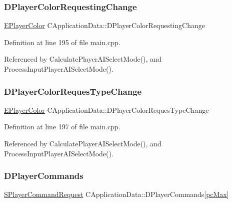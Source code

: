 \subsubsection{\texorpdfstring{D\+Player\+Color\+Requesting\+Change}{DPlayerColorRequestingChange}}
{\footnotesize\ttfamily \hyperlink{GameDataTypes_8h_aafb0ca75933357ff28a6d7efbdd7602f}{E\+Player\+Color} C\+Application\+Data\+::\+D\+Player\+Color\+Requesting\+Change\hspace{0.3cm}{\ttfamily [protected]}}



Definition at line 195 of file main.\+cpp.



Referenced by Calculate\+Player\+A\+I\+Select\+Mode(), and Process\+Input\+Player\+A\+I\+Select\+Mode().

\hypertarget{classCApplicationData_a6724e09974db5fe5f147d9898f468dbc}{}\label{classCApplicationData_a6724e09974db5fe5f147d9898f468dbc} 
\subsubsection{\texorpdfstring{D\+Player\+Color\+Reques\+Type\+Change}{DPlayerColorRequesTypeChange}}
{\footnotesize\ttfamily \hyperlink{GameDataTypes_8h_aafb0ca75933357ff28a6d7efbdd7602f}{E\+Player\+Color} C\+Application\+Data\+::\+D\+Player\+Color\+Reques\+Type\+Change\hspace{0.3cm}{\ttfamily [protected]}}



Definition at line 197 of file main.\+cpp.



Referenced by Calculate\+Player\+A\+I\+Select\+Mode(), and Process\+Input\+Player\+A\+I\+Select\+Mode().

\hypertarget{classCApplicationData_a2df1addeb7622233f72dc056bbcf31a1}{}\label{classCApplicationData_a2df1addeb7622233f72dc056bbcf31a1} 
\subsubsection{\texorpdfstring{D\+Player\+Commands}{DPlayerCommands}}
{\footnotesize\ttfamily \hyperlink{structSPlayerCommandRequest}{S\+Player\+Command\+Request} C\+Application\+Data\+::\+D\+Player\+Commands\mbox{[}\hyperlink{GameDataTypes_8h_aafb0ca75933357ff28a6d7efbdd7602fa594a5c8dd3987f24e8a0f23f1a72cd34}{pc\+Max}\mbox{]}\hspace{0.3cm}{\ttfamily [protected]}}



